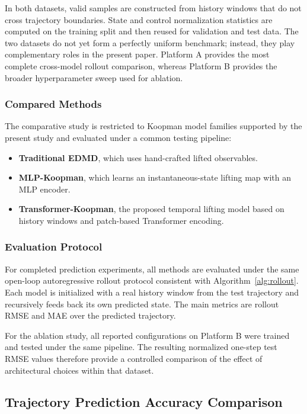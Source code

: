\documentclass[journal]{IEEEtran}
\begin{document}
In both datasets, valid samples are constructed from history windows that do not cross trajectory boundaries. State and control normalization statistics are computed on the training split and then reused for validation and test data. The two datasets do not yet form a perfectly uniform benchmark; instead, they play complementary roles in the present paper. Platform A provides the most complete cross-model rollout comparison, whereas Platform B provides the broader hyperparameter sweep used for ablation.

\subsubsection{Compared Methods}

The comparative study is restricted to Koopman model families supported by the present study and evaluated under a common testing pipeline:
\begin{itemize}
    \item \textbf{Traditional EDMD}, which uses hand-crafted lifted observables.
    \item \textbf{MLP-Koopman}, which learns an instantaneous-state lifting map with an MLP encoder.
    \item \textbf{Transformer-Koopman}, the proposed temporal lifting model based on history windows and patch-based Transformer encoding.
\end{itemize}

\subsubsection{Evaluation Protocol}

For completed prediction experiments, all methods are evaluated under the same open-loop autoregressive rollout protocol consistent with Algorithm~\ref{alg:rollout}. Each model is initialized with a real history window from the test trajectory and recursively feeds back its own predicted state. The main metrics are rollout RMSE and MAE over the predicted trajectory.

For the ablation study, all reported configurations on Platform B were trained and tested under the same pipeline. The resulting normalized one-step test RMSE values therefore provide a controlled comparison of the effect of architectural choices within that dataset.

\subsection{Trajectory Prediction Accuracy Comparison}
\end{document}
